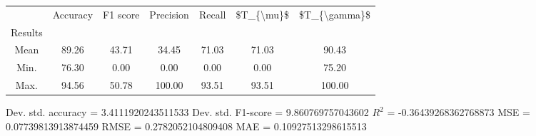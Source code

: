 \begin{tabular}{|c|c|c|c|c|c|c|}
\toprule
{} &  Accuracy &  F1 score &  Precision &  Recall &  \$T\_\{\textbackslash mu\}\$ &  \$T\_\{\textbackslash gamma\}\$ \\
Results &           &           &            &         &            &               \\
\hline
Mean    &     89.26 &     43.71 &      34.45 &   71.03 &      71.03 &         90.43 \\
Min.    &     76.30 &      0.00 &       0.00 &    0.00 &       0.00 &         75.20 \\
Max.    &     94.56 &     50.78 &     100.00 &   93.51 &      93.51 &        100.00 \\
\bottomrule
\end{tabular}

 Dev. std. accuracy = 3.4111920243511533
 Dev. std. F1-score = 9.860769757043602
 $R^2$ = -0.36439268362768873
 MSE = 0.07739813913874459
 RMSE = 0.2782052104809408
 MAE = 0.10927513298615513